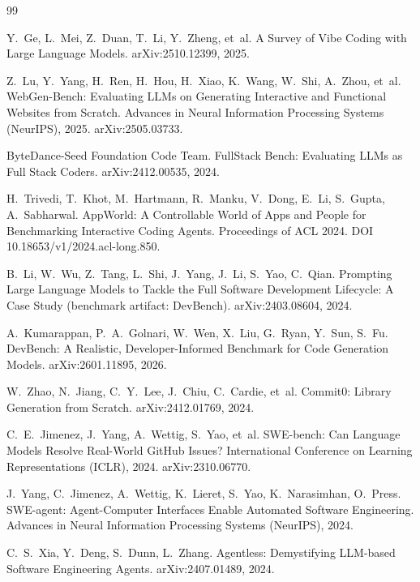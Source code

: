 \begin{thebibliography}{99}
\small

 Y.~Ge, L.~Mei, Z.~Duan, T.~Li, Y.~Zheng, et~al.
A Survey of Vibe Coding with Large Language Models.
arXiv:2510.12399, 2025.

 Z.~Lu, Y.~Yang, H.~Ren, H.~Hou, H.~Xiao, K.~Wang, W.~Shi, A.~Zhou, et~al.
WebGen-Bench: Evaluating LLMs on Generating Interactive and Functional Websites from Scratch.
Advances in Neural Information Processing Systems (NeurIPS), 2025. arXiv:2505.03733.

 ByteDance-Seed Foundation Code Team.
FullStack Bench: Evaluating LLMs as Full Stack Coders.
arXiv:2412.00535, 2024.

 H.~Trivedi, T.~Khot, M.~Hartmann, R.~Manku, V.~Dong, E.~Li, S.~Gupta, A.~Sabharwal.
AppWorld: A Controllable World of Apps and People for Benchmarking Interactive Coding Agents.
Proceedings of ACL 2024. DOI 10.18653/v1/2024.acl-long.850.

 B.~Li, W.~Wu, Z.~Tang, L.~Shi, J.~Yang, J.~Li, S.~Yao, C.~Qian.
Prompting Large Language Models to Tackle the Full Software Development Lifecycle: A Case Study (benchmark artifact: DevBench).
arXiv:2403.08604, 2024.

 A.~Kumarappan, P.~A.~Golnari, W.~Wen, X.~Liu, G.~Ryan, Y.~Sun, S.~Fu.
DevBench: A Realistic, Developer-Informed Benchmark for Code Generation Models.
arXiv:2601.11895, 2026.

 W.~Zhao, N.~Jiang, C.~Y.~Lee, J.~Chiu, C.~Cardie, et~al.
Commit0: Library Generation from Scratch.
arXiv:2412.01769, 2024.

 C.~E.~Jimenez, J.~Yang, A.~Wettig, S.~Yao, et~al.
SWE-bench: Can Language Models Resolve Real-World GitHub Issues?
International Conference on Learning Representations (ICLR), 2024. arXiv:2310.06770.

 J.~Yang, C.~Jimenez, A.~Wettig, K.~Lieret, S.~Yao, K.~Narasimhan, O.~Press.
SWE-agent: Agent-Computer Interfaces Enable Automated Software Engineering.
Advances in Neural Information Processing Systems (NeurIPS), 2024.

 C.~S.~Xia, Y.~Deng, S.~Dunn, L.~Zhang.
Agentless: Demystifying LLM-based Software Engineering Agents.
arXiv:2407.01489, 2024.


\end{thebibliography}
